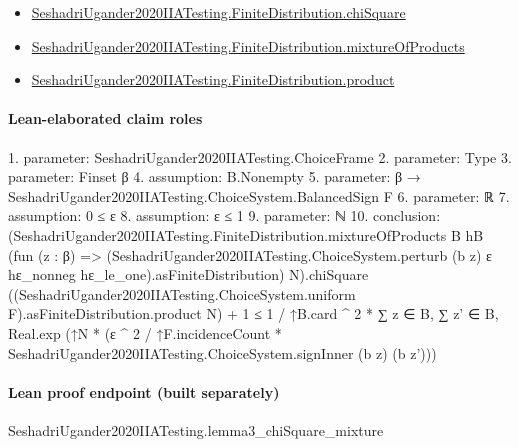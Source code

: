 \documentclass[10pt]{article}
\begin{document}
\begin{itemize}
\item \hyperlink{governing-declaration-d61b96c7277f5786}{Seshadri\allowbreak{}Ugander2020\allowbreak{}IIA\allowbreak{}Testing.\allowbreak{}Finite\allowbreak{}Distribution.\allowbreak{}chi\allowbreak{}Square}
\item \hyperlink{paper-prerequisite-4cbb8978d5ced12b}{Seshadri\allowbreak{}Ugander2020\allowbreak{}IIA\allowbreak{}Testing.\allowbreak{}Finite\allowbreak{}Distribution.\allowbreak{}mixture\allowbreak{}Of\allowbreak{}Products}
\item \hyperlink{governing-declaration-5fac9c490551d2cc}{Seshadri\allowbreak{}Ugander2020\allowbreak{}IIA\allowbreak{}Testing.\allowbreak{}Finite\allowbreak{}Distribution.\allowbreak{}product}
\end{itemize}
\paragraph{Lean-elaborated claim roles}\begin{ReviewVerbatim}
1. parameter: SeshadriUgander2020IIATesting.ChoiceFrame
2. parameter: Type
3. parameter: Finset β
4. assumption: B.Nonempty
5. parameter: β → SeshadriUgander2020IIATesting.ChoiceSystem.BalancedSign F
6. parameter: ℝ
7. assumption: 0 ≤ ε
8. assumption: ε ≤ 1
9. parameter: ℕ
10. conclusion: (SeshadriUgander2020IIATesting.FiniteDistribution.mixtureOfProducts B hB
          (fun (z : β) =>
            (SeshadriUgander2020IIATesting.ChoiceSystem.perturb (b z) ε hε_nonneg hε_le_one).asFiniteDistribution)
          N).chiSquare
      ((SeshadriUgander2020IIATesting.ChoiceSystem.uniform F).asFiniteDistribution.product N) +
    1 ≤
  1 / ↑B.card ^ 2 *
    ∑ z ∈ B,
      ∑ z' ∈ B,
        Real.exp (↑N * (ε ^ 2 / ↑F.incidenceCount * SeshadriUgander2020IIATesting.ChoiceSystem.signInner (b z) (b z')))
\end{ReviewVerbatim}

\paragraph{Lean proof endpoint (built separately)}\begin{ReviewVerbatim}
SeshadriUgander2020IIATesting.lemma3_chiSquare_mixture
\end{ReviewVerbatim}
\end{document}
